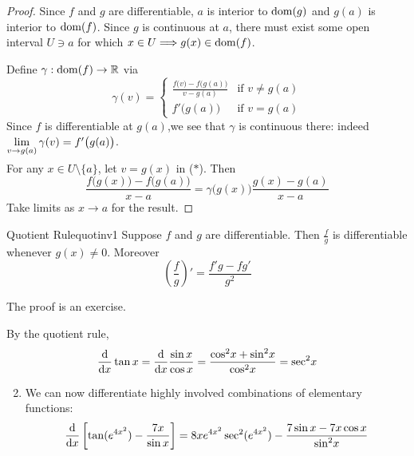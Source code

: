 \begin{proof}
	Since $f$ and $g$ are differentiable, $a$ is interior to $\operatorname{dom}(g)$ and $g(a)$ is interior to $\operatorname{dom}(f)$. Since $g$ is continuous at $a$, there must exist some open interval $U\ni a$ for which $x\in U\Longrightarrow g(x)\in\operatorname{dom}(f)$.\par
	Define $\gamma:\operatorname{dom}(f)\to\mathbb{R}$ via
	\[
		\gamma(v)=
		\begin{cases}
			\frac{f\big(v\big)-f\big(g(a)\big)}{v-g(a)}&\text{if }v\neq g(a)\\
			f'\big(g(a)\big)&\text{if }v=g(a)
		\end{cases} 
		\tag{$\ast$}
	\]
	Since $f$ is differentiable at $g(a)$,we see that $\gamma$ is continuous there: indeed $\smash[b]{\lim\limits_{v\to g(a)}\gamma(v)=f'\bigl(g(a)\bigr)}$.\par
	For any $x\in U\setminus\{a\}$, let $v=g(x)$ in ($\ast$). Then
	\[
		\frac{f\big(g(x)\big)-f\big(g(a)\big)}{x-a}
		=\gamma\bigl(g(x)\bigr)\frac{g(x)-g(a)}{x-a}
	\]
	Take limits as $x\to a$ for the result.
\end{proof}

\begin{cor}{Quotient Rule}{quotinv1}
	Suppose $f$ and $g$ are differentiable. Then $\frac fg$ is differentiable whenever $g(x)\neq 0$. Moreover
	\[
		\left(\frac fg\right)'=\frac{f' g-fg'}{g^2}
	\]
\end{cor}

The proof is an exercise.

\begin{examples}{}{}
	\exstart By the quotient rule,
		\[
			\frac{\mathrm{d} }{\mathrm{d} x}\tan x=\frac{\mathrm{d} }{\mathrm{d} x}\frac{\sin x}{\cos x}
			=\frac{\cos^2\!x+\sin^2\!x}{\cos^2\!x}=\sec^2\!x
		\]
	\begin{enumerate}\setcounter{enumi}{1}
		\item We can now differentiate highly involved combinations of elementary functions:
		\[
			\frac{\mathrm{d} }{\mathrm{d} x}\left[\tan(e^{4x^2})-\frac{7x}{\sin x}\right]
			=8xe^{4x^2}\sec^2(e^{4x^2})-\frac{7\sin x-7x\cos x}{\sin^2\!x}
		\]
	\end{enumerate}
\end{examples}

\goodbreak


